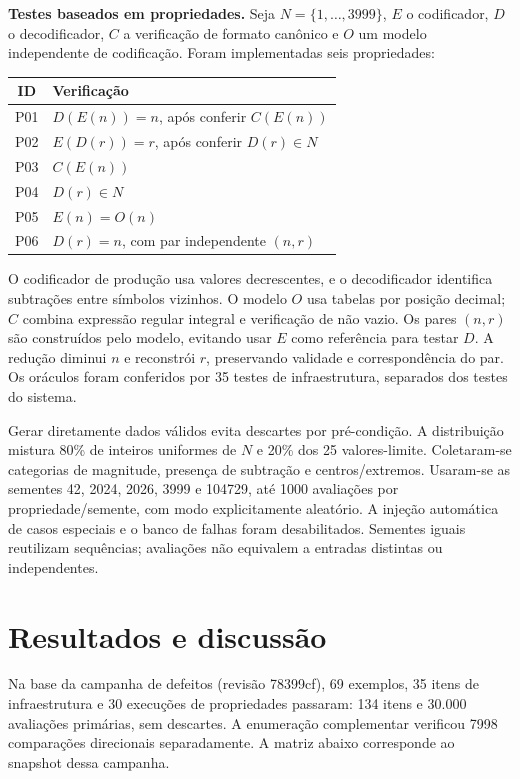 \documentclass[11pt,a4paper]{article}
\begin{document}
\textbf{Testes baseados em propriedades.} Seja $N=\{1,\ldots,3999\}$, $E$ o codificador, $D$ o decodificador, $C$ a verificação de formato canônico e $O$ um modelo independente de codificação. Foram implementadas seis propriedades:
\begin{center}
\small
\begin{tabular}{cl}
\toprule
ID & Verificação \\
\midrule
P01 & $D(E(n))=n$, após conferir $C(E(n))$ \\
P02 & $E(D(r))=r$, após conferir $D(r)\in N$ \\
P03 & $C(E(n))$ \\
P04 & $D(r)\in N$ \\
P05 & $E(n)=O(n)$ \\
P06 & $D(r)=n$, com par independente $(n,r)$ \\
\bottomrule
\end{tabular}
\end{center}
O codificador de produção usa valores decrescentes, e o decodificador identifica subtrações entre símbolos vizinhos. O modelo $O$ usa tabelas por posição decimal; $C$ combina expressão regular integral e verificação de não vazio. Os pares $(n,r)$ são construídos pelo modelo, evitando usar $E$ como referência para testar $D$. A redução diminui $n$ e reconstrói $r$, preservando validade e correspondência do par. Os oráculos foram conferidos por 35 testes de infraestrutura, separados dos testes do sistema.

Gerar diretamente dados válidos evita descartes por pré-condição. A distribuição mistura 80\% de inteiros uniformes de $N$ e 20\% dos 25 valores-limite. Coletaram-se categorias de magnitude, presença de subtração e centros/extremos. Usaram-se as sementes 42, 2024, 2026, 3999 e 104729, até 1000 avaliações por propriedade/semente, com modo explicitamente aleatório. A injeção automática de casos especiais e o banco de falhas foram desabilitados. Sementes iguais reutilizam sequências; avaliações não equivalem a entradas distintas ou independentes.

\section{Resultados e discussão}
Na base da campanha de defeitos (revisão 78399cf), 69 exemplos, 35 itens de infraestrutura e 30 execuções de propriedades passaram: 134 itens e 30.000 avaliações primárias, sem descartes. A enumeração complementar verificou 7998 comparações direcionais separadamente. A matriz abaixo corresponde ao snapshot dessa campanha.
\end{document}
